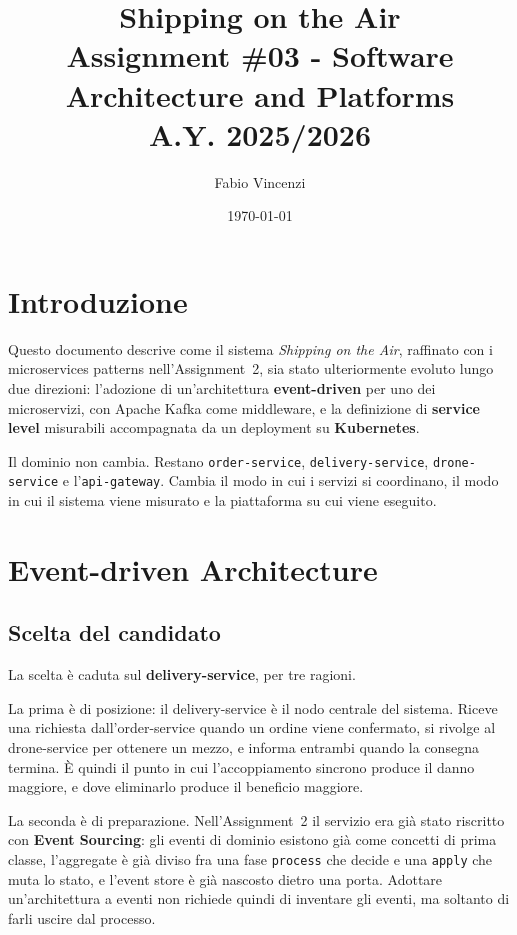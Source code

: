 \documentclass[12pt,a4paper]{article}
\title{
    \textbf{Shipping on the Air} \\[0.5em]
    \large Assignment \#03 - Software Architecture and Platforms \\[0.3em]
    \normalsize A.Y. 2025/2026
}
\author{Fabio Vincenzi}
\date{\today}
\begin{document}
\maketitle
\tableofcontents
\newpage

\section{Introduzione}

Questo documento descrive come il sistema \emph{Shipping on the Air}, raffinato con i microservices
patterns nell'Assignment~2, sia stato ulteriormente evoluto lungo due direzioni: l'adozione di
un'architettura \textbf{event-driven} per uno dei microservizi, con Apache Kafka come middleware, e
la definizione di \textbf{service level} misurabili accompagnata da un deployment su
\textbf{Kubernetes}.

Il dominio non cambia. Restano \texttt{order-service}, \texttt{delivery-service},
\texttt{drone-service} e l'\texttt{api-gateway}. Cambia il modo in cui i servizi si coordinano, il
modo in cui il sistema viene misurato e la piattaforma su cui viene eseguito.

\section{Event-driven Architecture}

\subsection{Scelta del candidato}

La scelta \`e caduta sul \textbf{delivery-service}, per tre ragioni.

La prima \`e di posizione: il delivery-service \`e il nodo centrale del sistema. Riceve una richiesta
dall'order-service quando un ordine viene confermato, si rivolge al drone-service per ottenere un
mezzo, e informa entrambi quando la consegna termina. \`E quindi il punto in cui l'accoppiamento
sincrono produce il danno maggiore, e dove eliminarlo produce il beneficio maggiore.

La seconda \`e di preparazione. Nell'Assignment~2 il servizio era gi\`a stato riscritto con
\textbf{Event Sourcing}: gli eventi di dominio esistono gi\`a come concetti di prima classe,
l'aggregate \`e gi\`a diviso fra una fase \texttt{process} che decide e una \texttt{apply} che muta
lo stato, e l'event store \`e gi\`a nascosto dietro una porta. Adottare un'architettura a eventi non
richiede quindi di inventare gli eventi, ma soltanto di farli uscire dal processo.
\end{document}
